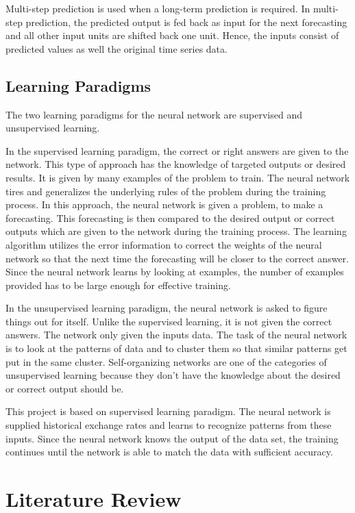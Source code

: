 \documentclass[journal]{IEEEtran}
\begin{document}
Multi-step prediction is used when a long-term prediction is required. In multi-step prediction, the predicted output is fed back as input for the next forecasting and all other input units are shifted back one unit. Hence, the inputs consist of predicted values as well the original  time series data.

\subsection{Learning Paradigms}

The two learning paradigms for the neural network  are supervised and unsupervised learning.

In the supervised learning paradigm, the correct or right answers are given to the network. This type of approach  has the  knowledge of targeted outputs or desired results. It is given by many examples of the problem to train. The neural network tires and generalizes the underlying rules of the problem  during the training process. In this approach, the neural network is given a problem, to make a forecasting. This forecasting is then compared to the desired output or correct outputs which are given to the network during the training process. The learning algorithm utilizes the error information to correct the weights of  the neural network so that the next time the forecasting will be closer to the correct answer. Since the neural network learns by looking at examples, the number of examples provided has to be large enough for effective training. 

In the unsupervised learning paradigm, the neural network is asked to figure things out for itself. Unlike the supervised learning, it is not given the correct answers. The network only given the inputs data.  The task of the neural network is to look at the patterns of data and to cluster them so that similar patterns get put in the same cluster. Self-organizing networks are one of the categories of unsupervised learning because they don't have the knowledge about the desired or correct output should be. 

This project  is based on supervised learning paradigm. The neural network is supplied historical exchange rates and learns to recognize patterns from these inputs. Since the neural network knows the output of the data set, the training continues until the network is able to match the data with sufficient accuracy.

\section{Literature Review}
\end{document}
